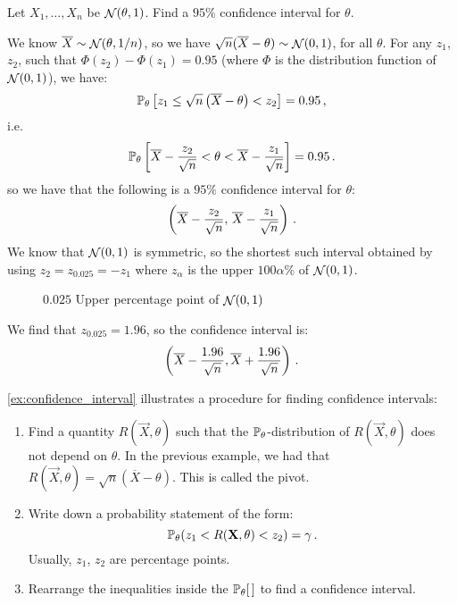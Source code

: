 \begin{example}[label=ex:confidence_interval]
Let $X_1, \dotsc, X_n$ be \iid $\mathop{\mathcal{N}}(\theta, 1)$. Find a $95\%$ confidence interval for $\theta$.

We know $\overline{X} \sim \mathop{\mathcal{N}}(\theta, 1/n)$, so we have $\sqrt{n}(\overline{X} - \theta) \sim \mathop{\mathcal{N}}(0, 1)$, for all $\theta$. For any $z_1$, $z_2$, such that $\Phi(z_2) - \Phi(z_1) = 0.95$ (where $\Phi$ is the distribution function of $\mathop{\mathcal{N}}(0, 1)$), we have:
\[
\mathbb{P}_\theta \left[ z_1 \leq \sqrt{n}\left(\overline{X} - \theta\right) < z_2 \right] = 0.95 \, {,}
\]
i.e.
\[
\mathbb{P}_\theta \left[ \overline{X} - \frac{z_2}{\sqrt{n}} < \theta < \overline{X} - \frac{z_1}{\sqrt{n}} \right] = 0.95 \, {.}
\]
so we have that the following is a $95\%$ confidence interval for $\theta$:
\[
\left( \overline{X} - \frac{z_2}{\sqrt{n}}, \, \overline{X} - \frac{z_1}{\sqrt{n}} \right) \, {.}
\]
We know that $\mathop{\mathcal{N}}(0, 1)$ is symmetric, so the shortest such interval obtained by using $z_2 = z_{0.025} = -z_1$ where $z_\alpha$ is the upper $100\alpha\%$ of $\mathop{\mathcal{N}}(0, 1)$.
\begin{figure}[h]
  \centering


  \caption{$0.025$ Upper percentage point of $\mathop{\mathcal{N}}(0, 1)$}
  \label{fig:5.1}
\end{figure}
We find that $z_{0.025} = 1.96$, so the confidence interval is:
\[
\left(\overline{X} - \frac{1.96}{\sqrt{n}}, \overline{X} + \frac{1.96}{\sqrt{n}} \right) \, {.}
\]
\end{example}

\vref{ex:confidence_interval} illustrates a procedure for finding confidence intervals:
\begin{enumerate}
\item Find a quantity $R(\vec{X}, \theta)$ such that the $\mathbb{P}_\theta$-distribution of $R(\vec{X}, \theta)$ does not depend on $\theta$.
In the previous example, we had that $R(\vec{X}, \theta) = \sqrt{n}(\overline{X} - \theta)$. This is called the pivot.

\item Write down a probability statement of the form:
\[
\mathbb{P}_\theta(z_1 < R(\mathbf{X}, \theta) < z_2) = \gamma \, {.}
\]
Usually, $z_1$, $z_2$ are percentage points.

\item Rearrange the inequalities inside the $\mathbb{P}_\theta[ \, ]$ to find a confidence interval.
\end{enumerate}

